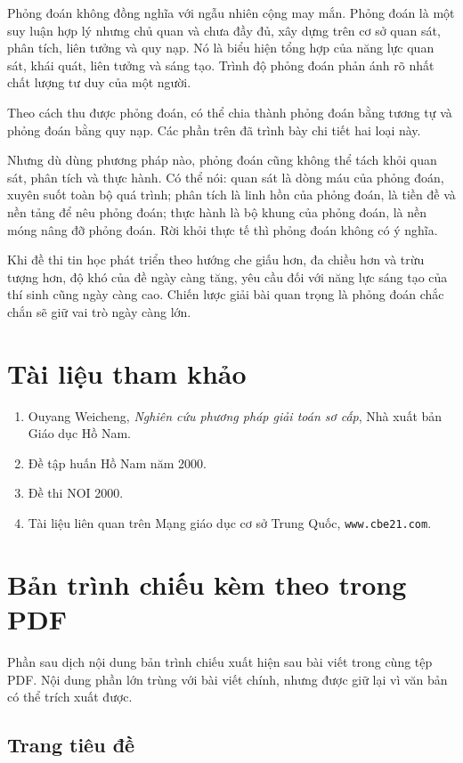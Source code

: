 \documentclass[11pt]{article}
\begin{document}
Phỏng đoán không đồng nghĩa với ngẫu nhiên cộng may mắn. Phỏng đoán là một
suy luận hợp lý nhưng chủ quan và chưa đầy đủ, xây dựng trên cơ sở quan sát,
phân tích, liên tưởng và quy nạp. Nó là biểu hiện tổng hợp của năng lực quan
sát, khái quát, liên tưởng và sáng tạo. Trình độ phỏng đoán phản ánh rõ nhất
chất lượng tư duy của một người.

Theo cách thu được phỏng đoán, có thể chia thành phỏng đoán bằng tương tự và
phỏng đoán bằng quy nạp. Các phần trên đã trình bày chi tiết hai loại này.

Nhưng dù dùng phương pháp nào, phỏng đoán cũng không thể tách khỏi quan sát,
phân tích và thực hành. Có thể nói: quan sát là dòng máu của phỏng đoán,
xuyên suốt toàn bộ quá trình; phân tích là linh hồn của phỏng đoán, là tiền
đề và nền tảng để nêu phỏng đoán; thực hành là bộ khung của phỏng đoán, là
nền móng nâng đỡ phỏng đoán. Rời khỏi thực tế thì phỏng đoán không có ý
nghĩa.

Khi đề thi tin học phát triển theo hướng che giấu hơn, đa chiều hơn và trừu
tượng hơn, độ khó của đề ngày càng tăng, yêu cầu đối với năng lực sáng tạo
của thí sinh cũng ngày càng cao. Chiến lược giải bài quan trọng là phỏng
đoán chắc chắn sẽ giữ vai trò ngày càng lớn.

\section*{Tài liệu tham khảo}

\begin{enumerate}
  \item Ouyang Weicheng, \emph{Nghiên cứu phương pháp giải toán sơ cấp}, Nhà
  xuất bản Giáo dục Hồ Nam.
  \item Đề tập huấn Hồ Nam năm 2000.
  \item Đề thi NOI 2000.
  \item Tài liệu liên quan trên Mạng giáo dục cơ sở Trung Quốc,
  \texttt{www.cbe21.com}.
\end{enumerate}

\appendix
\section{Bản trình chiếu kèm theo trong PDF}

Phần sau dịch nội dung bản trình chiếu xuất hiện sau bài viết trong cùng tệp
PDF. Nội dung phần lớn trùng với bài viết chính, nhưng được giữ lại vì văn
bản có thể trích xuất được.

\subsection{Trang tiêu đề}
\end{document}

